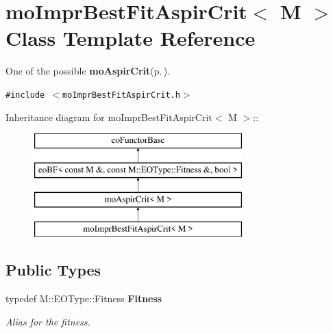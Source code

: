 \section{mo\-Impr\-Best\-Fit\-Aspir\-Crit$<$ M $>$ Class Template Reference}
\label{classmo_impr_best_fit_aspir_crit}
One of the possible {\bf mo\-Aspir\-Crit}{\rm (p.\,\pageref{classmo_aspir_crit})}.  


{\tt \#include $<$mo\-Impr\-Best\-Fit\-Aspir\-Crit.h$>$}

Inheritance diagram for mo\-Impr\-Best\-Fit\-Aspir\-Crit$<$ M $>$::\begin{figure}[H]
\begin{center}
\leavevmode
\includegraphics[height=4cm]{classmo_impr_best_fit_aspir_crit}
\end{center}
\end{figure}
\subsection*{Public Types}
\begin{CompactItemize}
\item 
typedef M::EOType::Fitness {\bf Fitness}\label{classmo_impr_best_fit_aspir_crit_w0}

\begin{CompactList}\small\item\em Alias for the fitness. \item\end{CompactList}\end{CompactItemize}
